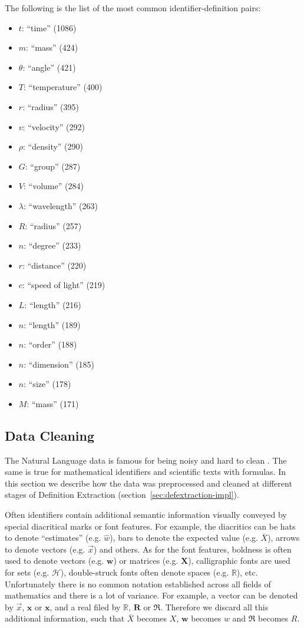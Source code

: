 The following is the list of the most common identifier-definition pairs:

\begin{itemize}
\item $t$: ``time'' (1086)
\item $m$: ``mass'' (424)
\item $\theta$: ``angle'' (421)
\item $T$: ``temperature'' (400)
\item $r$: ``radius'' (395)
\item $v$: ``velocity'' (292)
\item $\rho$: ``density'' (290)
\item $G$: ``group'' (287)
\item $V$: ``volume'' (284)
\item $\lambda$: ``wavelength'' (263)
\item $R$: ``radius'' (257)
\item $n$: ``degree'' (233)
\item $r$: ``distance'' (220)
\item $c$: ``speed of light'' (219)
\item $L$: ``length'' (216)
\item $n$: ``length'' (189)
\item $n$: ``order'' (188)
\item $n$: ``dimension'' (185)
\item $n$: ``size'' (178)
\item $M$: ``mass'' (171)
\end{itemize}



\subsection{Data Cleaning} \label{sec:datacleaning}

The Natural Language data is famous for being noisy and hard to 
clean \cite{sonntag2004assessing}. The same is true for 
mathematical identifiers and  scientific texts with formulas. 
In this section we describe how the data was preprocessed and 
cleaned at different stages of Definition Extraction 
(section~\ref{sec:defextraction-impl}).


Often identifiers contain additional semantic information visually conveyed 
by special diacritical marks or font features. For example, the diacritics can be   
hats to denote ``estimates'' (e.g. $\hat w$), bars to denote the expected value 
(e.g. $\bar X$), arrows to denote vectors (e.g. $\overrightarrow x$) and others.
As for the font features, boldness is often used to
denote vectors (e.g. $\mathbf w$) or matrices (e.g. $\mathbf X$), calligraphic fonts are 
used for sets (e.g. $\mathcal H$), double-struck fonts often denote spaces (e.g. $\mathbb R$),
etc. Unfortunately there is no common notation established across all fields of 
mathematics and there is a lot of variance. For example, 
a vector can be denoted by $\overrightarrow x$, $\boldsymbol x$ or $\mathbf x$, 
and a real filed by $\mathbb R$, $\mathbf R$ or $\mathfrak R$. 
Therefore we discard all this additional information, such that
$\bar X$ becomes $X$, $\mathbf w$ becomes $w$ and $\mathfrak R$ becomes $R$.


